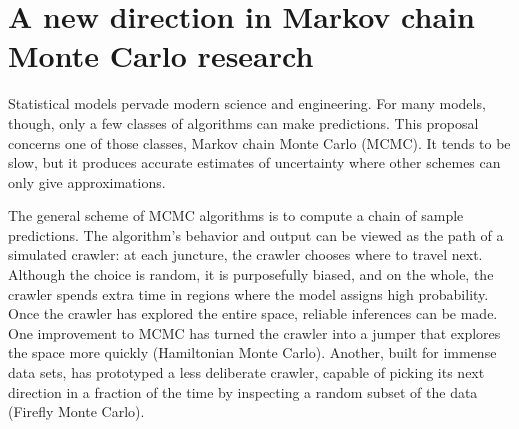 \documentclass[11pt,letterpaper]{article}
\newcommand{\required}[1]{\section*{\hfil #1\hfil}}                    %
\begin{document}


\setcounter{page}{1}
\required{A new direction in Markov chain Monte Carlo research}
Statistical models pervade modern science and engineering. For many models, though, only a few classes of algorithms can make predictions. This proposal concerns one of those classes, Markov chain Monte Carlo (MCMC). It tends to be slow, but it produces accurate estimates of uncertainty where other schemes can only give approximations.

The general scheme of MCMC algorithms is to compute a chain of sample predictions. The algorithm's behavior and output can be viewed as the path of a simulated crawler: at each juncture, the crawler chooses where to travel next. Although the choice is random, it is purposefully biased, and on the whole, the crawler spends extra time in regions where the model assigns high probability. Once the crawler has explored the entire space, reliable inferences can be made. One improvement to MCMC has turned the crawler into a jumper that explores the space more quickly (Hamiltonian Monte Carlo). Another, built for immense data sets, has prototyped a less deliberate crawler, capable of picking its next direction in a fraction of the time by inspecting a random subset of the data (Firefly Monte Carlo). 
\end{document}
